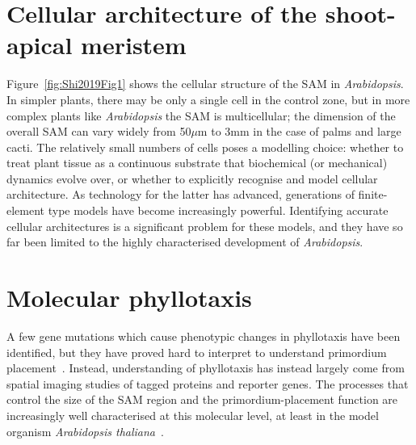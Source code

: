  

\section{Cellular architecture of the shoot-apical meristem}
Figure~\ref{fig:Shi2019Fig1} shows the cellular structure of the SAM in \textit{Arabidopsis}.  In simpler plants, there may be only a single cell in the control zone, but in more complex plants like \textit{Arabidopsis} the SAM is multicellular; the dimension of the overall SAM can vary widely from 50$\mu$m to 3mm in the case of palms and large cacti. The relatively small numbers of cells poses a modelling choice: whether to treat  plant tissue as a continuous substrate that biochemical (or mechanical) dynamics evolve over, or whether to explicitly recognise and model cellular architecture. As technology for the latter has advanced, generations of finite-element type models have become increasingly powerful. Identifying accurate cellular architectures is a significant problem for these models, and they have so far been limited to the highly characterised development of \textit{Arabidopsis}. 
 


\clearpage
\section{Molecular phyllotaxis}

A few gene mutations which cause phenotypic changes in phyllotaxis have been identified, but they have proved hard to interpret to understand primordium placement~\cite{kuhlemeierPhyllotaxis2017}. Instead,  understanding of phyllotaxis has instead largely come from spatial imaging studies of tagged proteins and  reporter genes. The processes that control the size of the SAM region and the primordium-placement function are increasingly well characterised at this molecular level, at least in the model organism \textit{Arabidopsis thaliana}~\cite{galvan-ampudiaTemporalIntegrationAuxin2020,cronkMolecularOrganographyPlants2009}.

